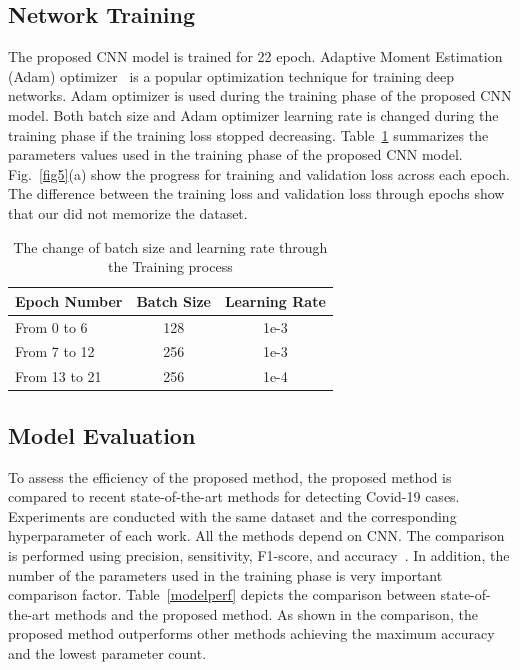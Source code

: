 \subsection{Network Training}
The proposed CNN model  is trained for 22 epoch. Adaptive Moment Estimation (Adam) optimizer~\cite{kingma2014adam} is a popular optimization  technique for training deep networks. Adam optimizer is used  during the training  phase of the proposed CNN model. Both batch size and Adam optimizer learning rate is changed during the training phase if the training loss stopped decreasing. Table~\ref{tabTrparam} summarizes the parameters values used in the training phase of the proposed CNN model. Fig.~\ref{fig5}(a) show the progress for training and validation loss across each epoch. The difference between the training loss and validation loss through epochs show that our did not memorize the dataset.
\begin{table}[htbp]
\caption{The change of batch size and learning rate through the Training process}
\begin{center}

\begin{tabular}{|l|c|c|}
\hline
\textbf{Epoch Number} & \textbf{Batch Size} & \textbf{Learning Rate} \\
\hline
\hline
From 0 to 6 & 128 & 1e-3\\
\hline
From 7 to 12 & 256 & 1e-3\\
\hline
From 13 to 21 & 256 & 1e-4\\
\hline
 
\end{tabular}
\label{tabTrparam}
\end{center}
\end{table}



\subsection{Model Evaluation}

To assess the efficiency of the proposed method,  the proposed method is compared to recent state-of-the-art methods for detecting Covid-19 cases. Experiments are conducted with the same dataset and the corresponding hyperparameter of each work. All the methods depend on CNN. The comparison is performed using precision, sensitivity, F1-score, and accuracy~\cite{hossin2015review}. In addition, the number of the parameters used in the training phase is very important comparison factor. Table~\ref{modelperf} depicts the comparison between state-of-the-art methods and the proposed method. As shown in the comparison, the proposed method  outperforms other methods achieving the maximum accuracy and the lowest  parameter count. 



